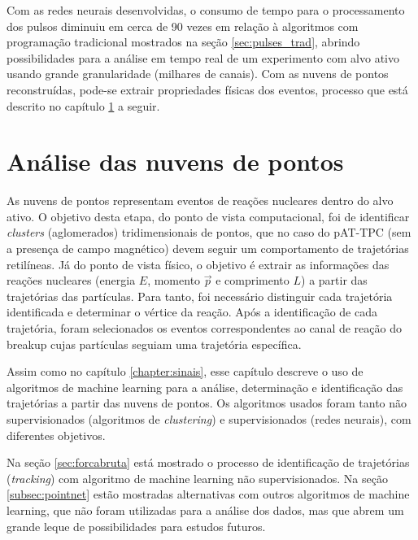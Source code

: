 \documentclass[a4paper,12pt,oneside]{book}
\begin{document}
\par Com as redes neurais desenvolvidas, o consumo de tempo para o processamento dos pulsos diminuiu em cerca de 90 vezes em relação à algoritmos com programação tradicional mostrados na seção \ref{sec:pulses_trad}, abrindo possibilidades para a análise em tempo real de um experimento com alvo ativo usando grande granularidade (milhares de canais). Com as nuvens de pontos reconstruídas, pode-se extrair propriedades físicas dos eventos, processo que está descrito no capítulo \ref{chapter:point_cloud_analysis} a seguir.

\chapter{Análise das nuvens de pontos}\label{chapter:point_cloud_analysis}

\par As nuvens de pontos representam eventos de reações nucleares dentro do alvo ativo. O objetivo desta etapa, do ponto de vista computacional, foi de identificar \textit{clusters} (aglomerados) tridimensionais de pontos, que no caso do pAT-TPC (sem a presença de campo magnético) devem seguir um comportamento de trajetórias retilíneas. Já do ponto de vista físico, o objetivo é extrair as informações das reações nucleares (energia $E$, momento $\vec{p}$ e comprimento $L$) a partir das trajetórias das partículas. Para tanto, foi necessário distinguir cada trajetória identificada e determinar o vértice da reação. Após a identificação de cada trajetória, foram selecionados os eventos correspondentes ao canal de reação do breakup cujas partículas seguiam uma trajetória específica.

\par Assim como no capítulo \ref{chapter:sinais}, esse capítulo descreve o uso de algoritmos de machine learning para a análise, determinação e identificação das trajetórias a partir das nuvens de pontos. Os algoritmos usados foram tanto não supervisionados (algoritmos de \textit{clustering}) e supervisionados (redes neurais), com diferentes objetivos.

\par Na seção \ref{sec:forcabruta} está mostrado o processo de identificação de trajetórias (\textit{tracking}) com algoritmo de machine learning não supervisionados. Na seção \ref{subsec:pointnet} estão mostradas alternativas com outros algoritmos de machine learning, que não foram utilizadas para a análise dos dados, mas que abrem um grande leque de possibilidades para estudos futuros.
\end{document}
